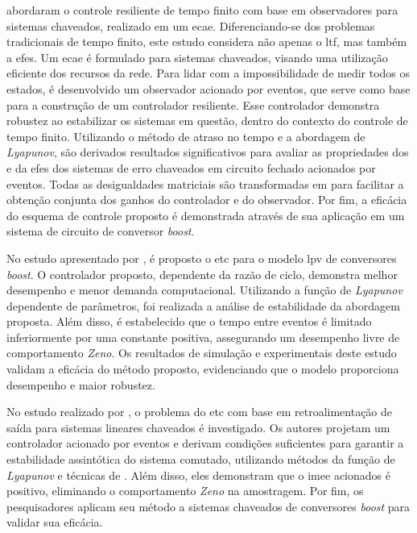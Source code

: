 \cite{Ren2018} abordaram o controle resiliente de tempo finito com base em observadores para sistemas chaveados, realizado em um \acrfull{ecae}. Diferenciando-se dos problemas tradicionais de tempo finito, este estudo considera não apenas o \acrfull{ltf}, mas também a \acrfull{efes}. Um \acrshort{ecae} é formulado para sistemas chaveados, visando uma utilização eficiente dos recursos da rede. Para lidar com a impossibilidade de medir todos os estados, é desenvolvido um observador acionado por eventos, que serve como base para a construção de um controlador resiliente. Esse controlador demonstra robustez ao estabilizar os sistemas em questão, dentro do contexto do controle de tempo finito. Utilizando o método de atraso no tempo e a abordagem de \textit{Lyapunov}, são derivados resultados significativos para avaliar as propriedades dos  e da \acrshort{efes} dos sistemas de erro chaveados em circuito fechado acionados por eventos. Todas as desigualdades matriciais são transformadas em  para facilitar a obtenção conjunta dos ganhos do controlador e do observador. Por fim, a eficácia do esquema de controle proposto é demonstrada através de sua aplicação em um sistema de circuito de conversor \textit{boost}.

No estudo apresentado por \cite{Soni2023}, é proposto o \acrshort{etc} para o modelo \acrshort{lpv} de conversores \textit{boost}. O controlador proposto, dependente da razão de ciclo, demonstra melhor desempenho e menor demanda computacional. Utilizando a função de \textit{\textit{Lyapunov }} dependente de parâmetros, foi realizada a análise de estabilidade da abordagem proposta. Além disso, é estabelecido que o tempo entre eventos é limitado inferiormente por uma constante positiva, assegurando um desempenho livre de comportamento \textit{Zeno}. Os resultados de simulação e experimentais deste estudo validam a eficácia do método proposto, evidenciando que o modelo proporciona desempenho e maior robustez.

No estudo realizado por \cite{Ma2016}, o problema do \acrshort{etc} com base em retroalimentação de saída para sistemas lineares chaveados é investigado. Os autores projetam um controlador acionado por eventos e derivam condições suficientes para garantir a estabilidade assintótica do sistema comutado, utilizando métodos da função de \textit{Lyapunov }e técnicas de . Além disso, eles demonstram que o \acrshort{imee} acionados é positivo, eliminando o comportamento \textit{Zeno} na amostragem. Por fim, os pesquisadores aplicam seu método a sistemas chaveados de conversores \textit{boost} para validar sua eficácia.

